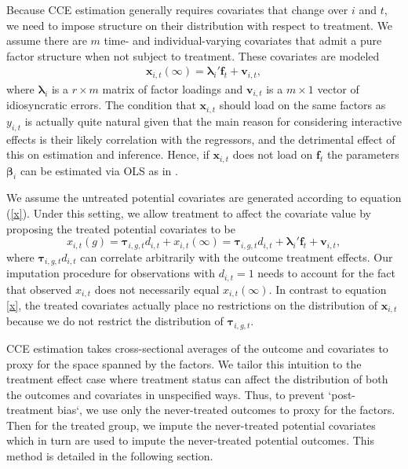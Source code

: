 \documentclass[12pt,fleqn]{article}
\def\*#1{\mathbf{#1}}
\def\+#1{\boldsymbol{#1}}
\begin{document}
Because CCE estimation generally requires covariates that change over $i$ and $t$, we need to impose structure on their distribution with respect to treatment. We assume there are $m$ time- and individual-varying covariates that admit a pure factor structure when not subject to treatment. These covariates are modeled
\begin{align}
\*x_{i,t}(\infty) = \+\lambda_i'\*f_t + \*v_{i,t}, \label{x}
\end{align}
where $\+\lambda_i$ is a $r \times m$ matrix of factor loadings and $\+ v_{i,t}$ is a $m \times 1$ vector of idiosyncratic errors. The condition that $\*x_{i,t}$ should load on the same factors as $y_{i,t}$ is actually quite natural given that the main reason for considering interactive effects is their likely correlation with the regressors, and the detrimental effect of this on estimation and inference. Hence, if $\*x_{i,t}$ does not load on $\*f_{t}$ the parameters $\+\beta_i$ can be estimated via OLS as in \citet{Wooldridge_2005}.

We assume the untreated potential covariates are generated according to equation (\ref{x}). Under this setting, we allow treatment to affect the covariate value by proposing the treated potential covariates to be
\begin{equation}
    x_{i,t}(g) = \+\tau_{i,g,t} d_{i,t} + x_{i,t}(\infty) = \+\tau_{i,g,t} d_{i,t} + \+\lambda_i'\*f_t + \*v_{i,t}, \label{observed x}
\end{equation}
where $\+\tau_{i,g,t} d_{i,t}$ can correlate arbitrarily with the outcome treatment effects. Our imputation procedure for observations with $d_{i,t} = 1$ needs to account for the fact that observed $x_{i,t}$ does not necessarily equal $x_{i,t}(\infty)$. In contrast to equation \eqref{x}, the treated covariates actually place no restrictions on the distribution of $\*x_{i,t}$ because we do not restrict the distribution of $\+\tau_{i,g,t}$.

CCE estimation takes cross-sectional averages of the outcome and covariates to proxy for the space spanned by the factors. We tailor this intuition to the treatment effect case where treatment status can affect the distribution of both the outcomes and covariates in unspecified ways. Thus, to prevent `post-treatment bias`, we use only the never-treated outcomes to proxy for the factors. Then for the treated group, we impute the never-treated potential covariates which in turn are used to impute the never-treated potential outcomes. This method is detailed in the following section.
\end{document}
